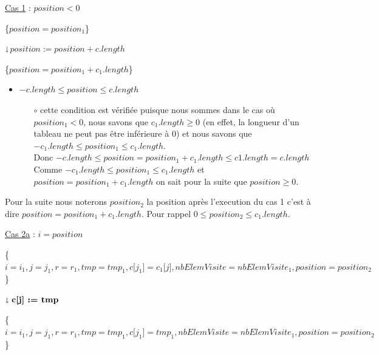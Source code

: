 	
	\begin{description}
		\item \underline{Cas 1} : $position < 0$
			\begin{description}
				\item \{$position=position_1$\}
				\item \quad\quad\quad $\shortdownarrow$$position := position + c.length$
				\item \{$position=position_1+c_1.length$\}
			\end{description}
		\begin{itemize}
			\item $-c.length \leq position \leq c.length$
				\begin{itemize}
					\item[$\circ$] cette condition est vérifiée puisque nous sommes dans le cas où $position_1<0$, nous savons que $c_1.length \geq 0$ (en effet, la longueur d’un tableau ne peut pas être inférieure à $0$) et nous savons que  $-c_1.length \leq position_1 \leq c_1.length$. \\
					Donc $-c.length \leq position = position_1+c_1.length \leq c1.length = c.length$  
					Comme $-c_1.length \leq position_1 \leq c_1.length$ et 
					$position=position_1+c_1.length$ on sait pour la suite que $position \geq 0$.				
				\end{itemize}
		\end{itemize}				
	\end{description}
	
	Pour la suite nous noterons $position_2$ la position après l’execution du cas 1 c’est à dire $position=position_1+c_1.length$. Pour rappel $0 \leq position_2 \leq c_1.length$.
	
	
	\begin{description}
		\item \underline{Cas 2a} : $i = position$		
	\end{description}	
	
	\{$i = i_1, j=j_1,r = r_1, tmp = tmp_1,c{[}j_1{]} = c_1{[}j{]}, nbElemVisite=nbElemVisite_1, position=position_2$\}\\
	\begin{description}
		\item \textbf{$\shortdownarrow \textbf{c{[}j{]} := tmp}$}	
	\end{description}

	
	\{$i = i_1, j=j_1,r = r_1, tmp = tmp_1,c{[}j_1{]} = tmp_1, nbElemVisite=nbElemVisite_1, position=position_2$\}\\	

